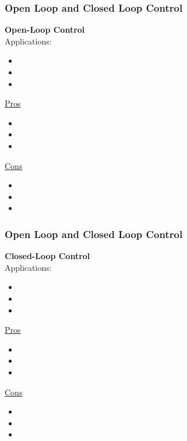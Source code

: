 \documentclass[fleqn]{beamer} %
\newcommand{\sectiontitleII}{Open Loop and Closed Loop Control}
\begin{document}
	\begin{frame} \small
		\frametitle{\sectiontitleII}

		\textbf{Open-Loop Control}\vspace{2mm}\\
		Applications:
		\begin{itemize}
			\item  
			\item
			\item
        \end{itemize}

        \begin{multicols}{2}
		\underline{Pros}
		\begin{itemize}
		\item
		\item
		\item
		\end{itemize}
		\underline{Cons}
		\begin{itemize}
		\item 
		\item
		\item
		\end{itemize}
		\end{multicols}

	\end{frame}

	\begin{frame} \small
		\frametitle{\sectiontitleII}

		\textbf{Closed-Loop Control}\vspace{2mm}\\
		Applications:
		\begin{itemize}
			\item  
			\item
			\item
        \end{itemize}

        \begin{multicols}{2}
		\underline{Pros}
		\begin{itemize}
		\item
		\item
		\item
		\end{itemize}
		\underline{Cons}
		\begin{itemize}
		\item 
		\item
		\item
		\end{itemize}
		\end{multicols}

	\end{frame}
\end{document}
